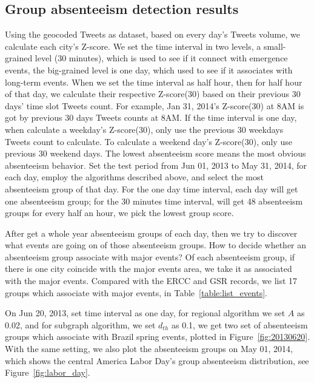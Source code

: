 \subsection{Group absenteeism detection results}
Using the geocoded Tweets as dataset, based on every day's Tweets volume, we calculate each city's Z-score. We set the time interval in two levels, a small-grained level (30 minutes), which is used to see if it connect with emergence events, the big-grained level is one day, which used to see if it associates with long-term events. When we set the time interval as half hour, then for half hour of that day, we calculate their respective Z-score(30) based on their previous 30 days' time slot Tweets count. For example, Jan 31, 2014's Z-score(30) at 8AM is got by previous 30 days Tweets counts at 8AM. If the time interval is one day, when calculate a weekday's Z-score(30), only use the previous 30 weekdays Tweets count to calculate. To calculate a weekend day's Z-score(30), only use previous 30 weekend days. The lowest absenteeism score means the most obvious absenteeism behavior. Set the test period from Jun 01, 2013 to May 31, 2014, for each day, employ the algorithms described above, and select the most absenteeism group of that day. For the one day time interval, each day will get one absenteeism group; for the 30 minutes time interval, will get 48 absenteeism groups for every half an hour, we pick the lowest group score.


After get a whole year absenteeism groups of each day, then we try to discover what events are going on of those absenteeism groups. How to decide whether an absenteeism group associate with major events? Of each absenteeism group, if there is one city coincide with the major events area, we take it as associated with the major events.
Compared with the ERCC and GSR records, we list 17 groups which associate with major events, in Table~\ref{table:list_events}.

On Jun 20, 2013, set time interval as one day, for regional algorithm we set $A$ as 0.02, and for subgraph algorithm, we set $d_{th}$ as 0.1, we get two set of absenteeism groups which associate with Brazil spring events, plotted in Figure~\ref{fig:20130620}. With the same setting, we also plot the absenteeism groups on May 01, 2014, which shows the central America Labor Day's group absenteeism distribution, see Figure~\ref{fig:labor_day}.

